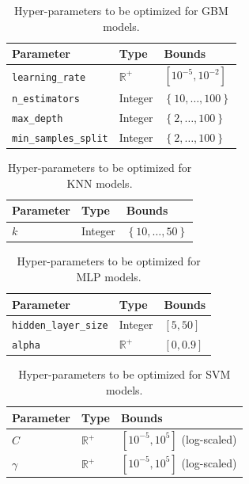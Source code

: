 \documentclass[runningheads,a4paper]{llncs}
\begin{document}
\begin{table}[ht]
\centering
\begin{tabular}{@{}lll@{}}
\toprule
\textbf{Parameter}             & \textbf{Type}  & \textbf{Bounds}                          \\ \midrule
\texttt{learning\_rate}      & $\mathbb{R}^+$ & $\left[10^{-5}, 10^{-2}\right]$                         \\
\texttt{n\_estimators}       & Integer        & $\left\lbrace 10,\dots, 100 \right\rbrace$ \\
\texttt{max\_depth}          & Integer        & $\left\lbrace 2, \dots, 100 \right\rbrace$ \\
\texttt{min\_samples\_split}  & Integer        & $\left\lbrace 2, \dots, 100 \right\rbrace$
\end{tabular}
\caption{Hyper-parameters to be optimized for GBM models.}
\label{gbmparam}
\end{table}

\begin{table}[ht]
\centering
\begin{tabular}{@{}lll@{}}
\toprule
\textbf{Parameter} & \textbf{Type} & \textbf{Bounds}                           \\ \midrule
$k$                & Integer       & $\left\lbrace 10, \dots,50 \right\rbrace$
\end{tabular}
\caption{Hyper-parameters to be optimized for KNN models.}
\label{knnparam}
\end{table}

\begin{table}[ht]
\centering
\begin{tabular}{lll}
\hline
\textbf{Parameter}             & \textbf{Type}    & \textbf{Bounds}       \\ \hline
\texttt{hidden\_layer\_size} & Integer          & $\left[5, 50\right]$  \\
\texttt{alpha}               & $\mathbb{R}^{+}$ & $\left[0, 0.9\right]$
\end{tabular}
\caption{Hyper-parameters to be optimized for MLP models.}
\label{mlpparam}
\end{table}

\begin{table}[ht]
\centering
\begin{tabular}{@{}lll@{}}
\toprule
\textbf{Parameter} & \textbf{Type}                      & \textbf{Bounds}               \\ \midrule
$C$                & $\mathbb{R}^+$ & $\left[ 10^{-5}, 10^{5} \right]$ (log-scaled) \\
$\gamma$           & $\mathbb{R}^+$ & $\left[10^{-5}, 10^{5} \right]$  (log-scaled)       \\ \bottomrule
\end{tabular}
\caption{Hyper-parameters to be optimized for SVM models.}
\label{svmparam}
\end{table}
\end{document}
